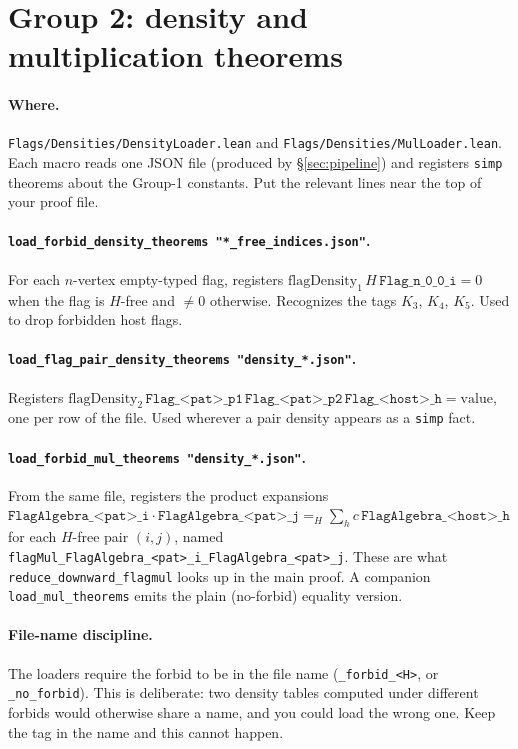 \documentclass[11pt]{article}
\begin{document}
\section{Group 2: density and multiplication theorems}
\label{sec:data}

\paragraph{Where.} \texttt{Flags/Densities/DensityLoader.lean} and
\texttt{Flags/Densities/MulLoader.lean}. Each macro reads one JSON file
(produced by \S\ref{sec:pipeline}) and registers \texttt{simp} theorems
about the Group-1 constants. Put the relevant lines near the top of your
proof file.

\paragraph{\texttt{load\_forbid\_density\_theorems "*\_free\_indices.json"}.}
For each $n$-vertex empty-typed flag, registers
$\mathrm{flagDensity}_1\,H\,\texttt{Flag\_n\_0\_0\_i} = 0$ when the flag is
$H$-free and $\ne 0$ otherwise. Recognizes the tags $K_3$, $K_4$, $K_5$.
Used to drop forbidden host flags.

\paragraph{\texttt{load\_flag\_pair\_density\_theorems "density\_*.json"}.}
Registers $\mathrm{flagDensity}_2\,\texttt{Flag\_<pat>\_p1}\,\texttt{Flag\_<pat>\_p2}\,\texttt{Flag\_<host>\_h} = \text{value}$,
one per row of the file. Used wherever a pair density appears as a
\texttt{simp} fact.

\paragraph{\texttt{load\_forbid\_mul\_theorems "density\_*.json"}.} From the
same file, registers the product expansions
$\texttt{FlagAlgebra\_<pat>\_i}\cdot\texttt{FlagAlgebra\_<pat>\_j}
=_H \sum_h c\,\texttt{FlagAlgebra\_<host>\_h}$
for each $H$-free pair $(i,j)$, named
\texttt{flagMul\_FlagAlgebra\_<pat>\_i\_FlagAlgebra\_<pat>\_j}. These are
what \texttt{reduce\_downward\_flagmul} looks up in the main proof. A
companion \texttt{load\_mul\_theorems} emits the plain (no-forbid) equality
version.

\paragraph{File-name discipline.} The loaders require the forbid to be in
the file name (\texttt{\_forbid\_<H>}, or \texttt{\_no\_forbid}). This is
deliberate: two density tables computed under different forbids would
otherwise share a name, and you could load the wrong one. Keep the tag in
the name and this cannot happen.
\end{document}
